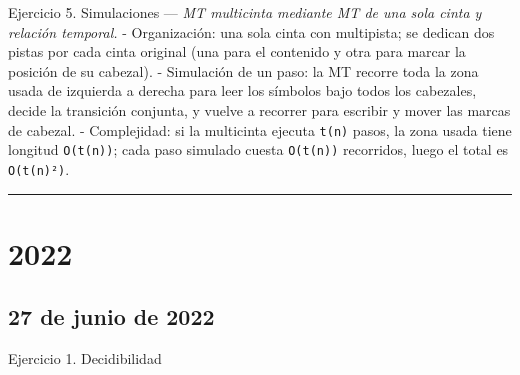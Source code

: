\documentclass[12pt]{book} %
\begin{document}
Ejercicio 5. Simulaciones --- \emph{MT multicinta mediante MT de una
sola cinta y relación temporal.} - Organización: una sola cinta con
multipista; se dedican dos pistas por cada cinta original (una para el
contenido y otra para marcar la posición de su cabezal). - Simulación de
un paso: la MT recorre toda la zona usada de izquierda a derecha para
leer los símbolos bajo todos los cabezales, decide la transición
conjunta, y vuelve a recorrer para escribir y mover las marcas de
cabezal. - Complejidad: si la multicinta ejecuta \texttt{t(n)} pasos, la
zona usada tiene longitud \texttt{O(t(n))}; cada paso simulado cuesta
\texttt{O(t(n))} recorridos, luego el total es \texttt{O(t(n)²)}.

\begin{center}\rule{0.5\linewidth}{0.5pt}\end{center}

\hypertarget{section-1}{%
\section{2022}\label{section-1}}

\hypertarget{de-junio-de-2022}{%
\subsection{27 de junio de 2022}\label{de-junio-de-2022}}

Ejercicio 1. Decidibilidad
\end{document}

